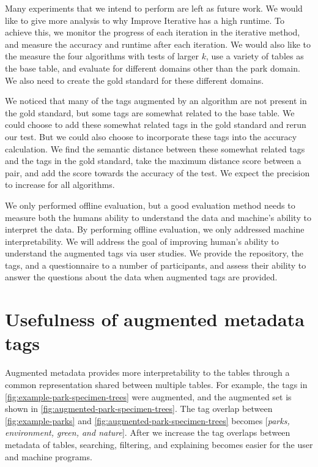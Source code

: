 Many experiments that we intend to perform are left as future work. We would like to give more analysis to why Improve Iterative has a high runtime. To achieve this, we monitor the progress of each iteration in the iterative method, and measure the accuracy and runtime after each iteration. We would also like to the measure the four algorithms with tests of larger $k$, use a variety of tables as the base table, and evaluate for different domains other than the park domain. We also need to create the gold standard for these different domains.

We noticed that many of the tags augmented by an algorithm are not present in the gold standard, but some tags are somewhat related to the base table. We could choose to add these somewhat related tags in the gold standard and rerun our test. But we could also choose to incorporate these tags into the accuracy calculation. We find the semantic distance between these somewhat related tags and the tags in the gold standard, take the maximum distance score between a pair, and add the score towards the accuracy of the test. We expect the precision to increase for all algorithms.

We only performed offline evaluation, but a good evaluation method needs to measure both the humans ability to understand the data and machine's ability to interpret the data. By performing offline evaluation, we only addressed machine interpretability. We will address the goal of improving human's ability to understand the augmented tags via user studies. We provide the repository, the tags, and a questionnaire to a number of participants, and assess their ability to answer the questions about the data when augmented tags are provided.

\section{Usefulness of augmented metadata tags}
\label{sec:UsefulnessOfAugmentedMetadataTags}

Augmented metadata provides more interpretability to the tables through a common representation shared between multiple tables. For example, the tags in \autoref{fig:example-park-specimen-trees} were augmented, and the augmented set is shown in \autoref{fig:augmented-park-specimen-trees}. The tag overlap between \autoref{fig:example-parks} and \autoref{fig:augmented-park-specimen-trees} becomes [\textit{parks, environment, green, and nature}]. After we increase the tag overlaps between metadata of tables, searching, filtering, and explaining becomes easier for the user and machine programs.

